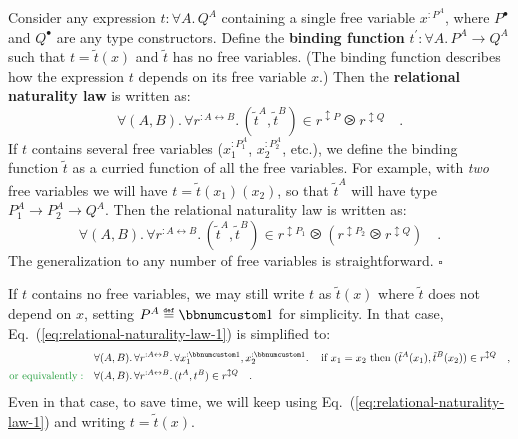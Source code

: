 Consider any expression $t:\forall A.\,Q^{A}$ containing a single
free variable $x^{:P^{A}}$, where $P^{\bullet}$ and $Q^{\bullet}$
are any type constructors. Define the \textbf{binding function} $t^{\prime}:\forall A.\,P^{A}\rightarrow Q^{A}$
such that $t=\tilde{t}(x)$ and $\tilde{t}$ has no free variables.
(The binding function describes how the expression $t$ depends on
its free variable $x$.) Then the \textbf{relational naturality law}
is written as:
\begin{equation}
\forall(A,B).\,\forall r^{:A\leftrightarrow B}.\,(\tilde{t}^{A},\tilde{t}^{B})\in r^{\updownarrow P}\ogreaterthan r^{\updownarrow Q}\quad.\label{eq:relational-naturality-law-1}
\end{equation}
If $t$ contains several free variables ($x_{1}^{:P_{1}^{A}}$, $x_{2}^{:P_{2}^{A}}$,
etc.), we define the binding function $\tilde{t}$ as a curried function
of all the free variables. For example, with \emph{two} free variables
we will have $t=\tilde{t}(x_{1})(x_{2})$, so that $\tilde{t}^{A}$
will have type $P_{1}^{A}\rightarrow P_{2}^{A}\rightarrow Q^{A}$.
Then the relational naturality law is written as:
\begin{equation}
\forall(A,B).\,\forall r^{:A\leftrightarrow B}.\,(\tilde{t}^{A},\tilde{t}^{B})\in r^{\updownarrow P_{1}}\ogreaterthan(r^{\updownarrow P_{2}}\ogreaterthan r^{\updownarrow Q})\quad.\label{eq:relational-naturality-law-two-free-vars}
\end{equation}
The generalization to any number of free variables is straightforward.
$\square$

If $t$ contains no free variables, we may still write $t$ as $\tilde{t}(x)$
where $\tilde{t}$ does not depend on $x$, setting $P^{A}\triangleq\bbnum 1$
for simplicity. In that case, Eq.~(\ref{eq:relational-naturality-law-1})
is simplified to:
\begin{align}
 & \forall(A,B).\,\forall r^{:A\leftrightarrow B}.\,\forall x_{1}^{:\bbnum 1},x_{2}^{:\bbnum 1}.\,\quad\text{if }x_{1}=x_{2}\text{ then }(\tilde{t}^{A}(x_{1}),\tilde{t}^{B}(x_{2}))\in r^{\updownarrow Q}\quad,\nonumber \\
{\color{greenunder}\text{or equivalently}:}\quad & \forall(A,B).\,\forall r^{:A\leftrightarrow B}.\,(t^{A},t^{B})\in r^{\updownarrow Q}\quad.\label{eq:relational-naturality-law-simplified-1}
\end{align}
Even in that case, to save time, we will keep using Eq.~(\ref{eq:relational-naturality-law-1})
and writing $t=\tilde{t}(x)$.

